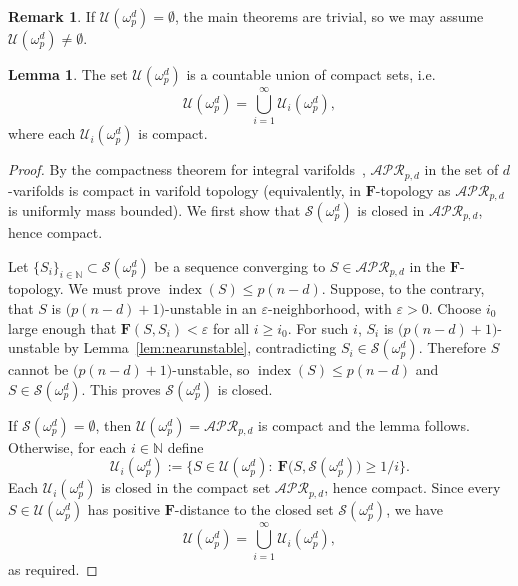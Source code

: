 \documentclass[12pt,english]{article}
\theoremstyle{definition}
\newtheorem{lemma}[theorem]{Lemma}
\newtheorem{remark}[theorem]{Remark}
\begin{document}
\begin{remark}
    If \(\mathcal{U}(\omega^d_p)=\emptyset\), the main theorems are trivial, so we may assume  \(\mathcal{U}(\omega^d_p)\neq\emptyset\).
\end{remark}

\begin{lemma}\label{lem:union_compact}
    The set \(\mathcal{U}(\omega^d_p)\) is a countable union of compact sets, i.e.
    \[
        \mathcal{U}(\omega^d_p)=\bigcup_{i=1}^\infty\mathcal{U}_i(\omega^d_p),
    \]
    where each \(\mathcal{U}_i(\omega^d_p)\) is compact.
\end{lemma}

\begin{proof}
    By the compactness theorem for integral varifolds~\cite{Allard}, \(\mathcal{APR}_{p,d}\) in the set of $d$-varifolds is compact in varifold topology (equivalently, in $\mathbf{F}$-topology as \(\mathcal{APR}_{p,d}\) is uniformly mass bounded). We first show that \(\mathcal{S}(\omega^d_p)\) is closed in \(\mathcal{APR}_{p,d}\), hence compact.

    Let \(\{S_i\}_{i\in\mathbb N}\subset\mathcal{S}(\omega^d_p)\) be a sequence converging to \(S\in\mathcal{APR}_{p,d}\) in the \(\mathbf F\)-topology. We must prove \(\operatorname{index}(S)\le p(n-d)\). Suppose, to the contrary, that \(S\) is \(\bigl(p(n-d)+1\bigr)\)-unstable in an $\varepsilon$-neighborhood, with $\varepsilon>0$. Choose \(i_0\) large enough that \(\mathbf F(S,S_i)<\varepsilon\) for all \(i\ge i_0\). For such \(i\), \(S_i\) is \(\bigl(p(n-d)+1\bigr)\)-unstable by Lemma~\ref{lem:nearunstable}, contradicting \(S_i\in\mathcal{S}(\omega^d_p)\). Therefore \(S\) cannot be \(\bigl(p(n-d)+1\bigr)\)-unstable, so \(\operatorname{index}(S)\le p(n-d)\) and \(S\in\mathcal{S}(\omega^d_p)\). This proves \(\mathcal{S}(\omega^d_p)\) is closed.

    If \(\mathcal{S}(\omega^d_p)=\emptyset\), then \(\mathcal{U}(\omega^d_p)=\mathcal{APR}_{p,d}\) is compact and the lemma follows. Otherwise, for each \(i\in\mathbb N\) define
    \[
        \mathcal{U}_i(\omega^d_p):=\{S\in\mathcal{U}(\omega^d_p):\ \mathbf F\bigl(S,\mathcal{S}(\omega^d_p)\bigr)\ge 1/i\}.
    \]
    Each \(\mathcal{U}_i(\omega^d_p)\) is closed in the compact set \(\mathcal{APR}_{p,d}\), hence compact. Since every \(S\in\mathcal{U}(\omega^d_p)\) has positive \(\mathbf F\)-distance to the closed set \(\mathcal{S}(\omega^d_p)\), we have
    \[
        \mathcal{U}(\omega^d_p)=\bigcup_{i=1}^\infty\mathcal{U}_i(\omega^d_p),
    \]
    as required.
\end{proof}
\end{document}

